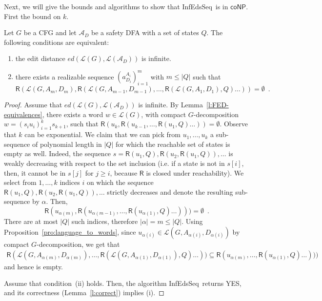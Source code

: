 \documentclass{CSML}
\newcommand{\aut}{\mathcal{A}}
\newcommand{\coNP}{\textsf{coNP}}
\newcommand{\lang}{\mathcal{L}}
\newcommand{\R}{\textsf{R}}
\newcommand{\algoFEDPDADFA}{\textsf{InfEdsSeq}}
\newcommand{\ed}{ed}
\begin{document}
Next, we will give the bounds and algorithms to show that \algoFEDPDADFA\ is in $\coNP$. First the bound on $k$. 
\begin{lem}\label{l:bound_k}
Let $G$ be a CFG and let $\aut_D$ be a safety DFA with a set of states $Q$.
The following conditions are equivalent:
\begin{enumerate}[label=(\roman*)]
\item the edit distance $\ed(\lang(G),\lang({\aut_D}))$ is infinite.
\item there exists a realizable sequence $(a_{D_i}^{A_i})_{i=1}^m$ with $m \leq |Q|$
such that \[\R(\lang(G,A_m, D_m) , \R(\lang(G,A_{m-1}, D_{m-1}), \ldots, \R(\lang(G,A_1, D_1), Q) \ldots )) = \emptyset\enspace .\]
\end{enumerate}
\end{lem}
\begin{proof}
Assume that $\ed(\lang(G),\lang({\aut_D}))$ is infinite. By Lemma~\ref{l:FED-equivalences},
there exists a word $w \in \lang(G)$, with compact $G$-decomposition
$w=(s_i u_i)_{i=1}^{k}s_{k+1}$, such that
$\R(u_k, \R(u_{k-1}, \ldots, \R(u_1, Q) \ldots )) = \emptyset$. Observe that $k$ can be exponential. We claim that we can 
pick from $u_1, \ldots, u_k$ a sub-sequence 
of polynomial length in $|Q|$ for which the reachable set of states is empty as well.
Indeed, the sequence $s=\R(u_1, Q), \R(u_2, \R(u_1, Q)), \ldots$
is weakly decreasing with respect to the set inclusion (i.e. if a state is not in $s[i]$, then, it cannot be in $s[j]$ for $j\geq i$, because $\R$ is closed under reachability). 
We select from $1,\ldots,k$ indices $i$ on which the sequence  $\R(u_1, Q), \R(u_2, \R(u_1, Q)), \ldots$ 
strictly decreases and denote the resulting sub-sequence by $\alpha$. 
Then, \[\R(u_{\alpha(m)}, \R(u_{\alpha(m-1)},\ldots, \R(u_{\alpha(1)}, Q) \ldots ))) = \emptyset\enspace .\]
There are at most $|Q|$ such indices, therefore $|\alpha| = m \leq |Q|$.
Using Proposition~\ref{pro:language_to_words}, since $u_{\alpha(i)}\in \lang(G,A_{\alpha(i)},D_{\alpha(i)})$ by compact $G$-decomposition,  we get that
\begin{align*}
\R(\lang(G,A_{\alpha(m)}, D_{\alpha(m)}) ,  \ldots, \R(\lang(G,A_{\alpha(1)}, D_{\alpha(1)}), Q) \ldots )) \subseteq \R(u_{\alpha(m)}, \ldots, \R(u_{\alpha(1)}, Q) \ldots )))
\end{align*}
and hence is empty.

Assume that condition~(ii) holds. Then, the algorithm \algoFEDPDADFA\ returns YES, and its correctness (Lemma~\ref{l:correct}) implies (i).
\end{proof}
\end{document}
